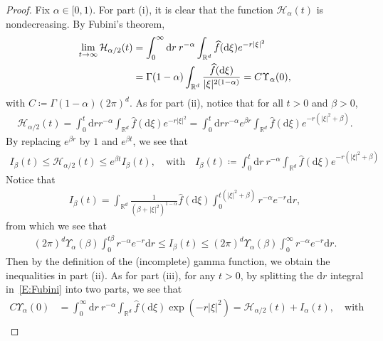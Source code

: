 \documentclass[sn-mathphys]{sn-jnl}%
\newcommand{\BR}{\mathbb{R}}
\newcommand{\ud}{\ensuremath{\mathrm{d}}}
\numberwithin{equation}{section}
\theoremstyle{thmstyleone}%
\theoremstyle{thmstyletwo}%
\theoremstyle{thmstylethree}%
\begin{document}
\begin{proof}
  Fix $\alpha\in[0,1)$. For part (i), it is clear that the function $\mathcal{H}_\alpha(t)$ is
  nondecreasing. By Fubini's theorem,
  \begin{align}\label{E:Fubini}
    \lim_{t\to\infty}\mathcal{H}_{\alpha/2}(t)
    & = \int_0^\infty \ud r \: r^{-\alpha} \int_{\BR^d} \widehat{f}(\ud\xi)e^{-r\lvert\xi\rvert^2} \notag \\
    & = \Gamma(1-\alpha) \int_{\BR^d} \frac{\widehat{f}(\ud\xi)}{\lvert\xi\rvert^{2\left(1-\alpha\right)}}
      = C \Upsilon_{\alpha}(0),
  \end{align}
  with $C\coloneqq \Gamma(1-\alpha)(2\pi)^d$. As for part (ii), notice that for all $t>0$ and
  $\beta>0$,
  \begin{align*}
    \mathcal{H}_{\alpha /2}(t)
    = \int_0^t \ud r r^{-\alpha} \int_{\BR^d} \widehat{f}(\ud\xi)e^{-r\lvert\xi\rvert^2}
    = \int_0^t \ud r r^{-\alpha} e^{\beta r} \int_{\BR^d} \widehat{f}(\ud\xi)e^{-r\left(\lvert\xi\rvert^2 +\beta\right)}.
  \end{align*}
  By replacing $e^{\beta r}$ by $1$ and $e^{\beta t}$, we see that
  \begin{align*}
    I_\beta(t)
    \le \mathcal{H}_{\alpha /2}(t)
    \le e^{\beta t} I_\beta(t), \quad \text{with} \quad
    I_\beta(t)\coloneqq
    \int_0^t \ud r\: r^{-\alpha} \int_{\BR^d} \widehat{f}(\ud\xi)e^{-r\left(\lvert\xi\rvert^2+\beta\right)}
  \end{align*}
   Notice that
  \begin{align*}
    I_\beta(t)
    = \int_{\BR^d} \frac{1}{\left(\beta+\lvert\xi\rvert^2\right)^{1-\alpha}} \widehat{f}(\ud\xi)
      \int_{0}^{t\left(\lvert\xi\rvert^2 + \beta\right)} r^{-\alpha} e^{-r} \ud r,
  \end{align*}
  from which we see that
  \begin{align*}
    \left(2\pi\right)^d\Upsilon_\alpha(\beta) \int_{0}^{t \beta} r^{-\alpha} e^{-r} \ud r
    \le I_\beta(t) \le
    \left(2\pi\right)^d\Upsilon_\alpha(\beta) \int_{0}^{\infty} r^{-\alpha} e^{-r} \ud r.
  \end{align*}
  Then by the definition of the (incomplete) gamma function, we obtain the inequalities in part
(ii). As for part (iii), for any $t>0$, by splitting the $\ud r$ integral in~\eqref{E:Fubini} into
two parts, we see that
  \begin{align*}
    C \Upsilon_{\alpha}(0) & = \int_0^\infty \ud r \: r^{-\alpha} \int_{\BR^d} \widehat{f}(\ud\xi)\exp\left(-r\lvert\xi\rvert^2\right) = \mathcal{H}_{\alpha/2}(t) + I_\alpha(t), \quad \text{with} \\

\end{align*}
\end{proof}
\end{document}
